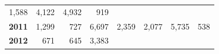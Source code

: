 \documentclass[]{article}
\begin{document}
\begin{longtable}[]{@{}rrrrrrrr@{}}
\begin{minipage}[t]{0.14\columnwidth}
1,588\strut
\end{minipage} & \begin{minipage}[t]{0.09\columnwidth}\raggedleft\strut
4,122\strut
\end{minipage} & \begin{minipage}[t]{0.08\columnwidth}\raggedleft\strut
4,932\strut
\end{minipage} & \begin{minipage}[t]{0.10\columnwidth}\raggedleft\strut
919\strut
\end{minipage}\tabularnewline
\begin{minipage}[t]{0.08\columnwidth}\raggedleft\strut
\textbf{2011}\strut
\end{minipage} & \begin{minipage}[t]{0.10\columnwidth}\raggedleft\strut
1,299\strut
\end{minipage} & \begin{minipage}[t]{0.11\columnwidth}\raggedleft\strut
727\strut
\end{minipage} & \begin{minipage}[t]{0.08\columnwidth}\raggedleft\strut
6,697\strut
\end{minipage} & \begin{minipage}[t]{0.14\columnwidth}\raggedleft\strut
2,359\strut
\end{minipage} & \begin{minipage}[t]{0.09\columnwidth}\raggedleft\strut
2,077\strut
\end{minipage} & \begin{minipage}[t]{0.08\columnwidth}\raggedleft\strut
5,735\strut
\end{minipage} & \begin{minipage}[t]{0.10\columnwidth}\raggedleft\strut
538\strut
\end{minipage}\tabularnewline
\begin{minipage}[t]{0.08\columnwidth}\raggedleft\strut
\textbf{2012}\strut
\end{minipage} & \begin{minipage}[t]{0.10\columnwidth}\raggedleft\strut
671\strut
\end{minipage} & \begin{minipage}[t]{0.11\columnwidth}\raggedleft\strut
645\strut
\end{minipage} & \begin{minipage}[t]{0.08\columnwidth}\raggedleft\strut
3,383\strut
\end{minipage} & \begin{minipage}[t]{0.14\columnwidth}\raggedleft\strut

\end{minipage}
\end{longtable}
\end{document}
